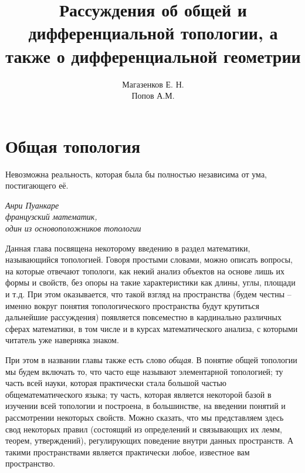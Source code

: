 \documentclass[a4paper, 12pt]{book}
\title{Рассуждения об общей и дифференциальной топологии, а также о дифференциальной геометрии}
\author{Магазенков Е. Н.\\Попов А.М.}
\begin{document}
	
	\renewcommand{\contentsname}{\hfillОГЛАВЛЕНИЕ\hfill} 
	\frontmatter
	\titlepage
	
	\doublespacing
	\tableofcontents
	\let\cleardoublepage\clearpage
	\singlespacing
	
	\mainmatter
	
	\pagestyle{style}
	
	
	\chapter{Общая топология}
	\epigraph{Невозможна реальность, которая была бы полностью независима от ума, постигающего её.	\leavevmode
	}{\itshape Анри Пуанкаре\\ французский математик,\\ один из основоположников топологии}
	
    Данная глава посвящена некоторому введению в раздел математики, называющийся топологией. Говоря простыми словами, можно описать вопросы, на которые отвечают топологи, как некий анализ объектов на основе лишь их формы и свойств, без опоры на такие характеристики как длины, углы, площади и т.д. При этом оказывается, что такой взгляд на пространства (будем честны -- именно вокруг понятия топологического пространства будут крутиться дальнейшие рассуждения) появляется повсеместно в кардинально различных сферах математики, в том числе и в курсах математического анализа, с которыми читатель уже наверняка знаком. 

    При этом в названии главы также есть слово \textit{общая}. В понятие общей топологии мы будем включать то, что часто еще называют элементарной топологией; ту часть всей науки, которая практически стала большой частью общематематического языка; ту часть, которая является некоторой базой в изучении всей топологии и построена, в большинстве, на введении понятий и рассмотрении некоторых свойств. Можно сказать, что мы представляем здесь свод некоторых правил (состоящий из определений и связывающих их лемм, теорем, утверждений), регулирующих поведение внутри данных пространств. А такими пространствами является практически любое, известное вам пространство.


	
	
	
	
	
	
	
	
	
	
	
	
	
\end{document}
